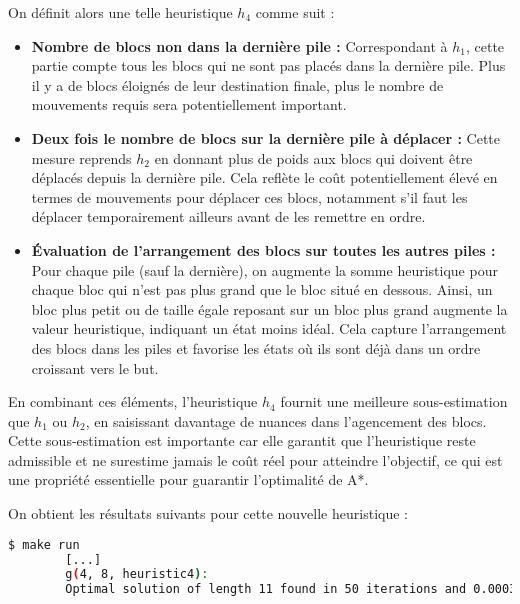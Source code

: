 On définit alors une telle heuristique $h_4$ comme suit :

\begin{itemize}
    \item \textbf{Nombre de blocs non dans la dernière pile :} Correspondant à \(h_1\), cette partie compte tous les blocs qui ne sont pas placés dans la dernière pile. Plus il y a de blocs éloignés de leur destination finale, plus le nombre de mouvements requis sera potentiellement important.
    
    \item \textbf{Deux fois le nombre de blocs sur la dernière pile à déplacer :} Cette mesure reprends \(h_2\) en donnant plus de poids aux blocs qui doivent être déplacés depuis la dernière pile. Cela reflète le coût potentiellement élevé en termes de mouvements pour déplacer ces blocs, notamment s'il faut les déplacer temporairement ailleurs avant de les remettre en ordre.
    
    \item \textbf{Évaluation de l'arrangement des blocs sur toutes les autres piles :} Pour chaque pile (sauf la dernière), 
    on augmente la somme heuristique pour chaque bloc qui n'est pas plus grand que le bloc situé en dessous. Ainsi, un bloc plus petit ou de taille égale reposant sur un bloc plus grand augmente la valeur heuristique, indiquant un état moins idéal. Cela capture l'arrangement des blocs dans les piles et favorise les états où ils sont déjà dans un ordre croissant vers le but.
\end{itemize}

En combinant ces éléments, l'heuristique $h_4$ fournit une meilleure sous-estimation que $h_1$ ou $h_2$, en saisissant davantage de nuances dans l'agencement des blocs. Cette sous-estimation est importante car elle garantit que l'heuristique reste admissible et ne surestime jamais le coût réel pour atteindre l'objectif, ce qui est une propriété essentielle pour guarantir l'optimalité de A*.

On obtient les résultats suivants pour cette nouvelle heuristique :

\begin{minipage}{\dimexpr\linewidth-20pt}
    \begin{lstlisting}[language=bash, caption={Résultats de l'exécution du programme de recherche de plus court chemin avec l'heuristique $h_4$ pour $k = 4$ piles et $n = 8$ blocs.}, label={lst:plus_court_chemin_results_h4_first_res}]
        $ make run
        [...]
        g(4, 8, heuristic4): 
        Optimal solution of length 11 found in 50 iterations and 0.000341 seconds
    \end{lstlisting}
\end{minipage}

